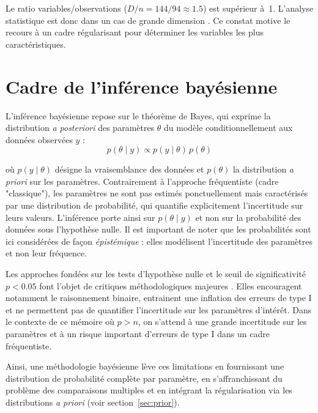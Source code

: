 \medskip

Le ratio variables/observations ($D/n = 144/94 \approx 1.5$) est supérieur à~1. L'analyse statistique est donc dans un cas de grande dimension%
. Ce constat motive le recours à un cadre régularisant pour déterminer les variables les plus caractéristiques.



\section{Cadre de l'inférence bayésienne}
L'inférence bayésienne repose sur le théorème de Bayes, qui exprime la distribution \textit{a posteriori} des paramètres $\theta$ du modèle conditionnellement aux données observées $y$ :
\[
p(\theta \mid y) \propto p(y \mid \theta)\, p(\theta)
\]


où $p(y \mid \theta)$ désigne la vraisemblance des données et $p(\theta)$ la distribution \textit{a priori} sur les paramètres. Contrairement à l'approche fréquentiste (cadre "classique"), les paramètres ne sont pas estimés ponctuellement mais caractérisés par une distribution de probabilité, qui quantifie explicitement l'incertitude sur leurs valeurs. L'inférence porte ainsi sur $p(\theta \mid y)$ et non sur la probabilité des données sous l'hypothèse nulle. Il est important de noter que les probabilités sont ici considérées de façon \textit{épistémique} : elles modélisent l'incertitude des paramètres et non leur fréquence.

Les approches fondées sur les tests d'hypothèse nulle et le seuil de significativité $p < 0.05$ font l'objet de critiques méthodologiques majeures \parencite{Amrhein2019Mar, Ioannidis2005Aug}. Elles encouragent notamment le raisonnement binaire, entrainent une inflation des erreurs de type I et ne permettent pas de quantifier l'incertitude sur les paramètres d'intérêt. Dans le contexte de ce mémoire où $p > n$, on s'attend à une grande incertitude sur les paramètres et à un risque important d'erreurs de type I dans un cadre fréquentiste. 


Ainsi, une méthodologie bayésienne lève ces limitations en fournissant une distribution de probabilité complète par paramètre, en s'affranchissant du problème des comparaisons multiples \parencite{Gelman2009Jul} %
 et en intégrant la régularisation via les distributions \textit{a priori} (voir section~\ref{sec:prior}). 

\medskip 


